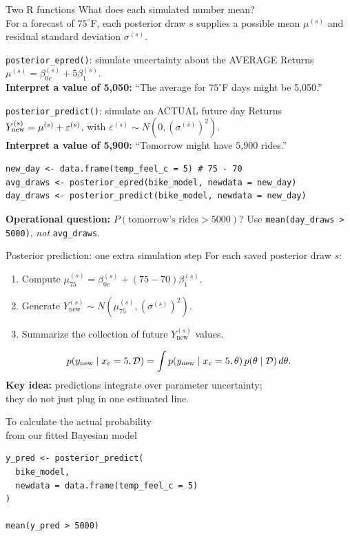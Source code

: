 \documentclass[aspectratio=43,11pt]{beamer}
\newcommand{\dd}{\mathcal D}
\begin{document}
\begin{frame}[fragile]{Two R functions}
\small
What does each simulated number mean?\\
For a forecast of $75^\circ$F, each posterior draw $s$ supplies a possible
mean $\mu^{(s)}$ and residual standard deviation $\sigma^{(s)}$.
\begin{block}{\texttt{posterior\_epred()}: simulate uncertainty about the AVERAGE}
Returns $\mu^{(s)}=\beta_{0c}^{(s)}+5\beta_1^{(s)}$.\\
\textbf{Interpret a value of 5,050:} ``The average for $75^\circ$F days might be 5,050.''
\end{block}
\begin{block}{\texttt{posterior\_predict()}: simulate an ACTUAL future day}
Returns $Y_{\rm new}^{(s)}=\mu^{(s)}+\varepsilon^{(s)}$,
with $\varepsilon^{(s)}\sim N(0,(\sigma^{(s)})^2)$.\\
\textbf{Interpret a value of 5,900:} ``Tomorrow might have 5,900 rides.''
\end{block}
\begin{verbatim}
new_day <- data.frame(temp_feel_c = 5) # 75 - 70
avg_draws <- posterior_epred(bike_model, newdata = new_day)
day_draws <- posterior_predict(bike_model, newdata = new_day)
\end{verbatim}
\vspace{-3pt}
\centering\textbf{Operational question:} $P(\text{tomorrow's rides}>5000)$?
Use \texttt{mean(day\_draws > 5000)}, \emph{not} \texttt{avg\_draws}.
\end{frame}

\begin{frame}{Posterior prediction: one extra simulation step}
For each saved posterior draw $s$:
\begin{enumerate}
\item Compute $\mu_{75}^{(s)}=\beta_{0c}^{(s)}+(75-70)\beta_1^{(s)}$.
\item Generate $Y_{\mathrm{new}}^{(s)}\sim N(\mu_{75}^{(s)},(\sigma^{(s)})^2)$.
\item Summarize the collection of future $Y_{\mathrm{new}}^{(s)}$ values.
\end{enumerate}
\[p(y_{\rm new}\mid x_c=5,\dd)=\int p(y_{\rm new}\mid x_c=5,\theta)\,p(\theta\mid\dd)\,d\theta.\]
\textbf{Key idea:} predictions integrate over parameter uncertainty;\\
they do not just plug in one estimated line.
\end{frame}

\begin{frame}[fragile]{To calculate the actual probability\\from our fitted Bayesian model}
\begin{verbatim}
y_pred <- posterior_predict(
  bike_model,
  newdata = data.frame(temp_feel_c = 5)
)

mean(y_pred > 5000)
\end{verbatim}
\end{frame}
\end{document}
